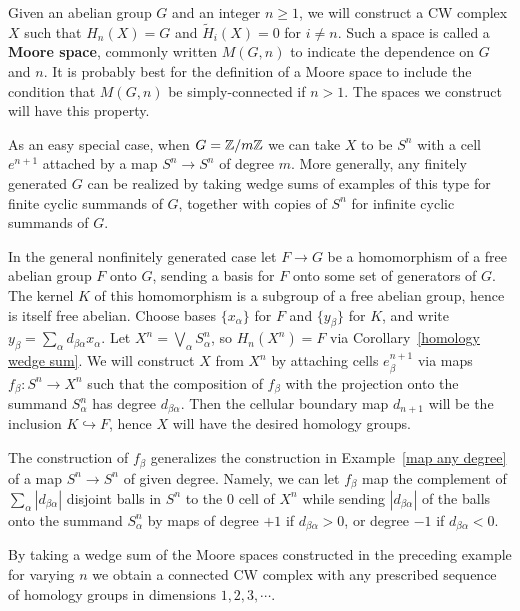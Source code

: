 \begin{example}
Given an abelian group $G$ and an integer $n\geq1$, we will construct a CW complex $X$ such that $H_n(X)=G$ and $\widetilde{H}_i(X)=0$ for $i\neq n$. Such a space is called a \textbf{Moore space}, commonly written $M(G,n)$ to indicate the dependence on $G$ and $n$. It is probably best for the definition of a Moore space to include the condition that $M(G,n)$ be simply-connected if $n>1$. The spaces we construct will have this property.\par
As an easy special case, when $G=\mathbb{Z}/m\mathbb{Z}$ we can take $X$ to be $S^n$ with a cell $e^{n+1}$ attached by a map $S^n\to S^n$ of degree $m$. More generally, any finitely generated $G$ can be realized by taking wedge sums of examples of this type for finite cyclic summands of $G$, together with copies of $S^n$ for infinite cyclic summands of $G$.\par
In the general nonfinitely generated case let $F\to G$ be a homomorphism of a free abelian group $F$ onto $G$, sending a basis for $F$ onto some set of generators of $G$. The kernel $K$ of this homomorphism is a subgroup of a free abelian group, hence is itself free abelian. Choose bases $\{x_\alpha\}$ for $F$ and $\{y_\beta\}$ for $K$, and write $y_\beta=\sum_\alpha d_{\beta\alpha}x_\alpha$. Let $X^n=\bigvee_\alpha S^n_\alpha$, so $H_n(X^n)=F$ via Corollary~\ref{homology wedge sum}. We will construct $X$ from $X^n$ by attaching cells $e^{n+1}_\beta$ via maps $f_\beta:S^n\to X^n$ such that the composition of $f_\beta$ with the
projection onto the summand $S^n_\alpha$ has degree $d_{\beta\alpha}$. Then the cellular boundary map $d_{n+1}$ will be the inclusion $K\hookrightarrow F$, hence $X$ will have the desired homology groups.\par
The construction of $f_\beta$ generalizes the construction in Example~\ref{map any degree} of a map $S^n\to S^n$ of given degree. Namely, we can let $f_\beta$ map the complement of $\sum_\alpha|d_{\beta\alpha}|$ disjoint balls in $S^n$ to the $0$ cell of $X^n$ while sending $|d_{\beta\alpha}|$ of the balls onto the summand $S^n_\alpha$ by maps of degree $+1$ if $d_{\beta\alpha}>0$, or degree $-1$ if $d_{\beta\alpha}<0$.
\end{example}
\begin{example}
By taking a wedge sum of the Moore spaces constructed in the preceding
example for varying $n$ we obtain a connected CW complex with any prescribed
sequence of homology groups in dimensions $1,2,3,\cdots$.
\end{example}
